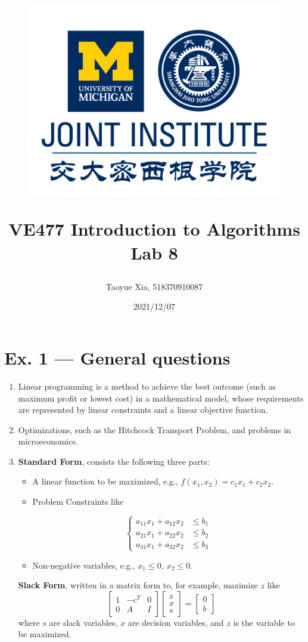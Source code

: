\documentclass[12pt, a4paper]{article}
\title{
    \begin{figure}[H]
        \centering
        \includegraphics{AAA.png}
    \end{figure}
    VE477 Introduction to Algorithms\\ 
    Lab 8}
\author{Taoyue Xia, 518370910087}
\date{2021/12/07}
\begin{document}
\maketitle

\newpage
\section*{Ex. 1 --- General questions}
\begin{enumerate}
    \item Linear programming is a method to achieve the best outcome (such as maximum profit or lowest cost) in a mathematical model, 
          whose requirements are represented by linear constraints and a linear objective function.
    \item Optimizations, such as the Hitchcock Transport Problem, and problems in microeconomics.
    \item \textbf{Standard Form}, consists the following three parts:
          \begin{itemize}
              \item A linear function to be maximized, e.g., $f(x_1, x_2) = c_1x_1 + c_2x_2$.
              \item Problem Constraints like

                    \[
                        \begin{cases}
                            a_{11}x_1 + a_{12}x_2 &\leq b_1\\
                            a_{21}x_1 + a_{22}x_2 &\leq b_2\\
                            a_{31}x_1 + a_{32}x_2 &\leq b_3
                        \end{cases}    
                    \]
              \item Non-negative variables, e.g., $x_1 \leq 0,\ x_2\leq 0$.

          \end{itemize}

          \textbf{Slack Form}, written in a matrix form to, for example, maximize $z$ like
          \[\begin{bmatrix} 1 & -c^T & 0\\ 0 & A & I \end{bmatrix} \begin{bmatrix} z\\ x\\ s \end{bmatrix} = \begin{bmatrix}
              0\\ b \end{bmatrix}\]
          where $s$ are slack variables, $x$ are decision variables, and $z$ is the variable to be maximized.


\end{enumerate}
\end{document}
